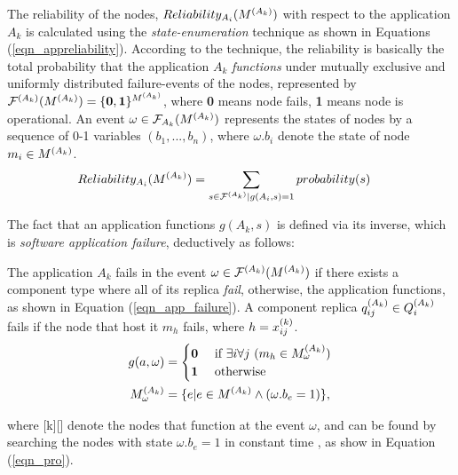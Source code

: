 The reliability of the nodes, $Reliability_{A_i}(\ssp{M})$ with respect to the application ${A_k}$ is calculated using the \textit{state-enumeration} technique \cite{Lucet1999ExactReliability}  as shown in Equations (\ref{eqn_appreliability}). According to the technique, the reliability is basically the total probability that the application $A_k$ \textit{functions} under mutually exclusive and uniformly distributed failure-events of the nodes, represented by $\ssp{\mathcal{F}}(\ssp{M})=\{\textbf{0},\textbf{1}\}^{\ssp{M}}$, where  \textbf{0} means node fails, \textbf{1} means  node is operational. An event $\omega\in \mathcal{F}_{A_k}(\ssp{M})$ represents the states of nodes by a sequence of 0-1 variables $(b_1,...,b_n)$, where $\omega.b_i$ denote the state of node $m_i\in \ssp{M}$. %
\begin{align}
\label{eqn_appreliability}
Reliability_{A_i}(\ssp{M})&=\sum_{s\in \ssp{\mathcal{F}}|g(A_i, s)=1}probability(s)
\end{align}

The fact that an application functions $g(A_k, s)$ is defined via its inverse, which is \textit{software application failure}, deductively as follows:
\begin{definition}
The application $A_k$ fails in the event $\omega \in \ssp{\mathcal{F}}(\ssp{M})$ if there exists a component type  where all of its replica  \textit{fail}, otherwise, the application functions, as shown in Equation (\ref{eqn_app_failure}).  A component replica $\sss{q}[k][ij]\in \sss{Q}$ fails if the node that host it $m_h$ fails, where $h=x^{(k)}_{ij}$.  
\begin{align}
\label{eqn_app_failure}
g(a, \omega)&= 
\begin{cases}
\textbf{0} & \mbox{ if } \exists i\forall j\ (m_h\in \sss{M}[k][\omega] )\\
\textbf{1} & \mbox{ otherwise }
\end{cases}\\
\label{eqn_appreliability_node_s}
\sss{M}[k][\omega]&=\{e|e\in \ssp{M} \land (\omega.b_e=1) \},
\end{align}
\end{definition}
where [k][\omega] denote the nodes that function at the event $\omega$, and can be found by searching the nodes  with state $\omega.b_e=1$ in constant time , as show in Equation (\ref{eqn_pro}).

